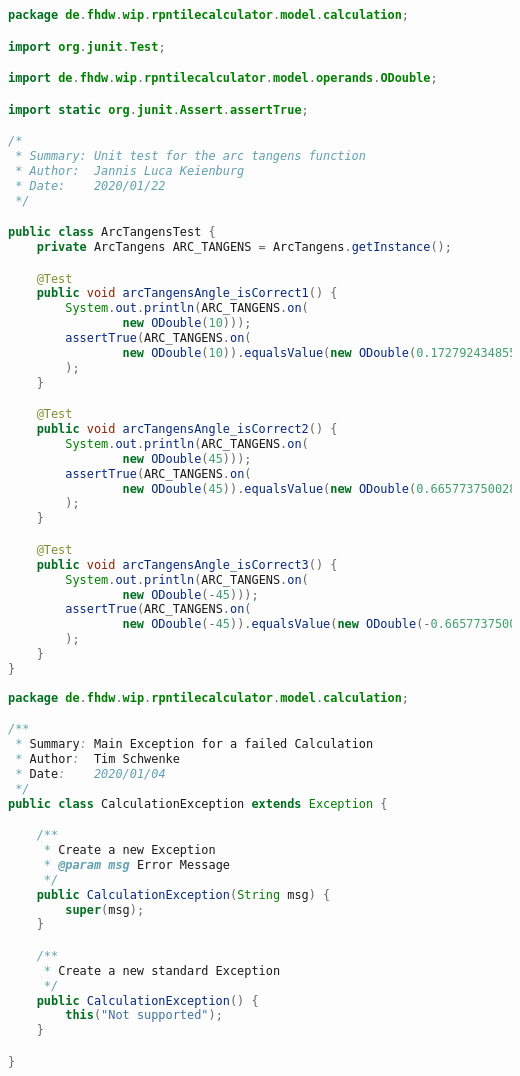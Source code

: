 \begin{lstlisting}[caption=ArcTangensTest (Keienburg),label=list:ArcTangensTest,language=Java]
package de.fhdw.wip.rpntilecalculator.model.calculation;

import org.junit.Test;

import de.fhdw.wip.rpntilecalculator.model.operands.ODouble;

import static org.junit.Assert.assertTrue;

/*
 * Summary: Unit test for the arc tangens function
 * Author:  Jannis Luca Keienburg
 * Date:    2020/01/22
 */

public class ArcTangensTest {
    private ArcTangens ARC_TANGENS = ArcTangens.getInstance();

    @Test
    public void arcTangensAngle_isCorrect1() {
        System.out.println(ARC_TANGENS.on(
                new ODouble(10)));
        assertTrue(ARC_TANGENS.on(
                new ODouble(10)).equalsValue(new ODouble(0.1727924348551592))
        );
    }

    @Test
    public void arcTangensAngle_isCorrect2() {
        System.out.println(ARC_TANGENS.on(
                new ODouble(45)));
        assertTrue(ARC_TANGENS.on(
                new ODouble(45)).equalsValue(new ODouble(0.6657737500283538))
        );
    }

    @Test
    public void arcTangensAngle_isCorrect3() {
        System.out.println(ARC_TANGENS.on(
                new ODouble(-45)));
        assertTrue(ARC_TANGENS.on(
                new ODouble(-45)).equalsValue(new ODouble(-0.6657737500283538))
        );
    }
}
\end{lstlisting}    

\begin{lstlisting}[caption=CalculationException (Schwenke),label=list:CalculationException,language=Java]
package de.fhdw.wip.rpntilecalculator.model.calculation;

/**
 * Summary: Main Exception for a failed Calculation
 * Author:  Tim Schwenke
 * Date:    2020/01/04
 */
public class CalculationException extends Exception {

    /**
     * Create a new Exception
     * @param msg Error Message
     */
    public CalculationException(String msg) {
        super(msg);
    }

    /**
     * Create a new standard Exception
     */
    public CalculationException() {
        this("Not supported");
    }

}
\end{lstlisting}    

